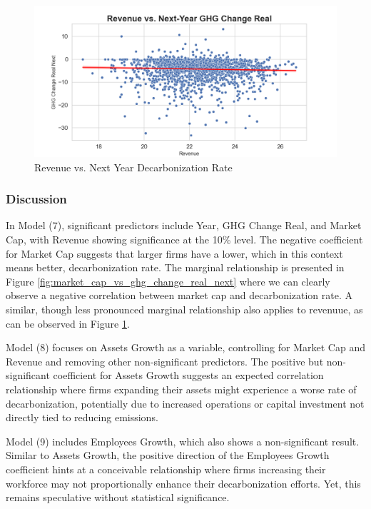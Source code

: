 \begin{figure}[H]
\centering
  \includegraphics[width=\textwidth]{figures/revenue_vs_ghg_change_real_next.png}
\caption{Revenue vs. Next Year Decarbonization Rate}
\label{fig:revenue_vs_ghg_change_real_next}
\end{figure}

\subsubsection{Discussion}
In Model (7), significant predictors include Year, GHG Change Real, and Market Cap, with Revenue showing significance at the 10\% level. The negative coefficient for Market Cap suggests that larger firms have a lower, which in this context means better, decarbonization rate. The marginal relationship is presented in Figure \ref{fig:market_cap_vs_ghg_change_real_next} where we can clearly observe a negative correlation between market cap and decarbonization rate. A similar, though less pronounced marginal relationship also applies to revenuue, as can be observed in Figure \ref{fig:revenue_vs_ghg_change_real_next}.
    

Model (8) focuses on Assets Growth as a variable, controlling for Market Cap and Revenue and removing other non-significant predictors. The positive but non-significant coefficient for Assets Growth suggests an expected correlation relationship where firms expanding their assets might experience a worse rate of decarbonization, potentially due to increased operations or capital investment not directly tied to reducing emissions. 
    

Model (9) includes Employees Growth, which also shows a non-significant result. Similar to Assets Growth, the positive direction of the Employees Growth coefficient hints at a conceivable relationship where firms increasing their workforce may not proportionally enhance their decarbonization efforts. Yet, this remains speculative without statistical significance. 
    

